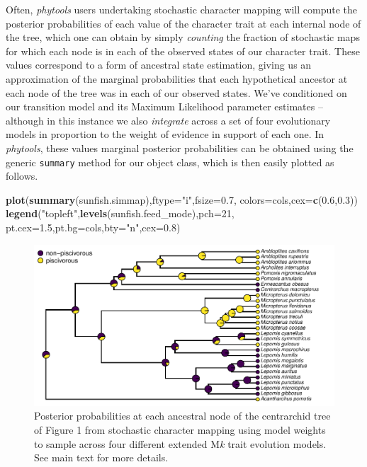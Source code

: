 \documentclass[fleqn,10pt,lineno]{wlpeerj} %
\newenvironment{Shaded}{\begin{snugshade}}{\end{snugshade}}
\newcommand{\AttributeTok}[1]{\textcolor[rgb]{0.13,0.29,0.53}{#1}}
\newcommand{\DecValTok}[1]{\textcolor[rgb]{0.00,0.00,0.81}{#1}}
\newcommand{\FloatTok}[1]{\textcolor[rgb]{0.00,0.00,0.81}{#1}}
\newcommand{\FunctionTok}[1]{\textcolor[rgb]{0.13,0.29,0.53}{\textbf{#1}}}
\newcommand{\NormalTok}[1]{#1}
\newcommand{\StringTok}[1]{\textcolor[rgb]{0.31,0.60,0.02}{#1}}
\begin{document}
Often, \emph{phytools} users undertaking stochastic character mapping will compute the posterior probabilities of each value of the character trait at each internal node of the tree, which one can obtain by simply \emph{counting} the fraction of stochastic maps for which each node is in each of the observed states of our character trait. These values correspond to a form of ancestral state estimation, giving us an approximation of the marginal probabilities that each hypothetical ancestor at each node of the tree was in each of our observed states. We've conditioned on our transition model and its Maximum Likelihood parameter estimates -- although in this instance we also \emph{integrate} across a set of four evolutionary models in proportion to the weight of evidence in support of each one. In \emph{phytools}, these values marginal posterior probabilities can be obtained using the generic \texttt{summary} method for our object class, which is then easily plotted as follows.

\begin{Shaded}
\begin{Highlighting}[]
\FunctionTok{plot}\NormalTok{(}\FunctionTok{summary}\NormalTok{(sunfish.simmap),}\AttributeTok{ftype=}\StringTok{"i"}\NormalTok{,}\AttributeTok{fsize=}\FloatTok{0.7}\NormalTok{,}
  \AttributeTok{colors=}\NormalTok{cols,}\AttributeTok{cex=}\FunctionTok{c}\NormalTok{(}\FloatTok{0.6}\NormalTok{,}\FloatTok{0.3}\NormalTok{))}
\FunctionTok{legend}\NormalTok{(}\StringTok{"topleft"}\NormalTok{,}\FunctionTok{levels}\NormalTok{(sunfish.feed\_mode),}\AttributeTok{pch=}\DecValTok{21}\NormalTok{,}
  \AttributeTok{pt.cex=}\FloatTok{1.5}\NormalTok{,}\AttributeTok{pt.bg=}\NormalTok{cols,}\AttributeTok{bty=}\StringTok{"n"}\NormalTok{,}\AttributeTok{cex=}\FloatTok{0.8}\NormalTok{)}
\end{Highlighting}
\end{Shaded}

\begin{figure}
\includegraphics[width=1\linewidth]{Revell.phytools-v2_peerj_files/figure-latex/fig02-posterior-probs-1} \caption{Posterior probabilities at each ancestral node of the centrarchid tree of Figure 1 from stochastic character mapping using model weights to sample across four different extended M\textit{k} trait evolution models. See main text for more details.}\label{fig:fig02-posterior-probs}
\end{figure}
\end{document}
